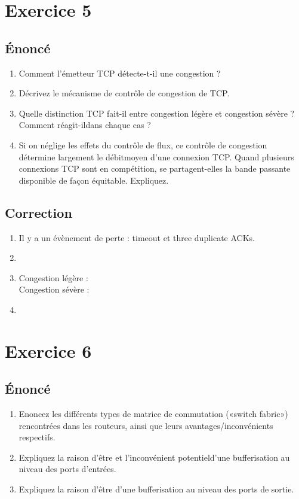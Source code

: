 \documentclass[a4paper, 11pt, titlepage]{article}
\begin{document}
\section{Exercice 5}
\subsection{\'Enoncé}
\begin{enumerate}[label=(\alph*)]
  \item Comment l’émetteur TCP détecte-t-il une congestion ?
  \item Décrivez le mécanisme de contrôle de congestion de TCP.
  \item Quelle distinction TCP fait-il entre congestion légère et congestion sévère ? Comment réagit-ildans chaque cas ? 
  \item Si on néglige les effets du contrôle de flux, ce contrôle de congestion détermine largement le débitmoyen d’une connexion TCP. Quand plusieurs connexions TCP sont en compétition, se partagent-elles la bande passante disponible de façon équitable. Expliquez.
\end{enumerate}

\subsection{Correction}
\begin{enumerate}[label=(\alph*)]
\item 
Il y a un évènement de perte : timeout et three duplicate ACKs.

\item

\item 
Congestion légère : \\

Congestion sévère : \\

\item 

\end{enumerate}

\section{Exercice 6}
\subsection{\'Enoncé}
\begin{enumerate}[label=(\alph*)]
  \item Enoncez les différents types de matrice de commutation («switch fabric») rencontrées dans les routeurs, ainsi que leurs avantages/inconvénients respectifs.
  \item Expliquez la raison d’être et l’inconvénient potentield’une bufferisation au niveau des ports d’entrées.
  \item Expliquez la raison d’être d’une bufferisation au niveau des ports de sortie.
\end{enumerate}
\end{document}
